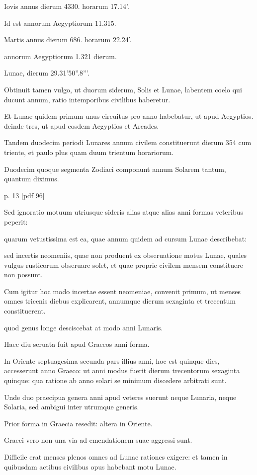 Iovis annus dierum 4330. horarum 17.14'.

Id est annorum Aegyptiorum 11.315.

Martis annus dierum
686. horarum 22.24'.

annorum Aegyptiorum 1.321 dierum.

Lunae,
dierum 29.31'50''.8'''.

Obtinuit tamen vulgo, ut duorum siderum,
Solis et Lunae, labentem coelo qui ducunt annum, ratio intemporibus
civilibus haberetur.

Et Lunae quidem primum unus circuitus
pro anno habebatur, ut apud Aegyptios. deinde tres, ut apud eosdem
Aegyptios et Arcades.

Tandem duodecim periodi Lunares annum
civilem constituerunt dierum 354 cum triente, et paulo plus quam
duum trientum horariorum.

Duodecim quoque segmenta Zodiaci
componunt annum Solarem tantum, quantum diximus.


p. 13 [pdf 96]

Sed ignoratio
motuum utriusque sideris alias atque alias anni formas veteribus
peperit:

quarum vetustissima est ea, quae annum quidem ad cursum
Lunae describebat:

sed incertis neomeniis, quae non produent ex obseruatione
motus Lunae, quales vulgus rusticorum obseruare solet, et
quae proprie civilem mensem constituere non possunt.

Cum igitur
hoc modo incertae essent neomeniae, convenit primum, ut menses omnes
tricenis diebus explicarent, annumque dierum sexaginta et trecentum
constituerent.

quod genus longe desciscebat at modo anni
Lunaris.

Haec diu seruata fuit apud Graecos anni forma.

In Oriente
septuagesima secunda pars illius anni, hoc est quinque dies, accesserunt
anno Graeco: ut anni modus fuerit dierum trecentorum sexaginta quinque:
qua ratione ab anno solari se minimum discedere arbitrati sunt.

Unde duo praecipua genera anni apud veteres suerunt neque Lunaria,
neque Solaria, sed ambigui inter utrumque generis.

Prior forma in Graecia resedit: altera in Oriente.

Graeci vero non una via ad emendationem
suae aggressi sunt.

Difficile erat menses plenos omnes ad
Lunae rationes exigere: et tamen in quibusdam actibus civilibus opus
habebant motu Lunae.

